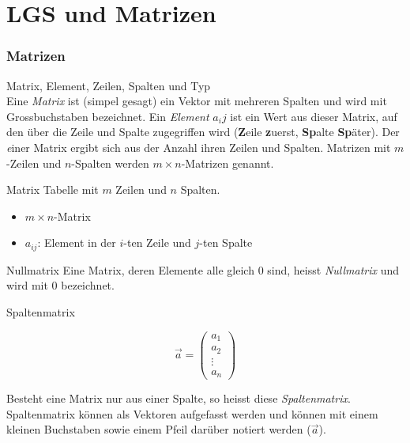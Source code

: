 \graphicspath{{images/}}
\section*{LGS und Matrizen}

\subsubsection*{Matrizen}

    \begin{definition}{{Matrix, Element, Zeilen, Spalten und Typ}}\\
        Eine \textit{Matrix} ist (simpel gesagt) ein Vektor mit mehreren Spalten 
        und wird mit Grossbuchstaben bezeichnet.
        Ein \textit{Element} $a_ij$ ist ein Wert aus dieser Matrix,
        auf den über die Zeile und Spalte zugegriffen wird (\textbf{Z}eile \textbf{z}uerst,
        \textbf{Sp}alte \textbf{Sp}äter).
        Der \textit einer Matrix ergibt sich aus der Anzahl ihren Zeilen und Spalten.
        Matrizen mit $m$-Zeilen und $n$-Spalten werden $m\times n$-Matrizen genannt.
    \end{definition}

    \begin{definition}{Matrix}
        Tabelle mit $m$ Zeilen und $n$ Spalten.
        \begin{itemize}
            \item $m \times n$-Matrix
            \item $a_{ij}$: Element in der $i$-ten Zeile und $j$-ten Spalte
        \end{itemize}
    \end{definition}

    \begin{definition}{Nullmatrix}
        Eine Matrix, deren Elemente alle gleich $0$ sind, heisst \textit{Nullmatrix} und wird mit $0$ bezeichnet.
    \end{definition}

    \begin{definition}{Spaltenmatrix}
        \begin{figure}
            \vspace{-20pt}
            \begin{equation*}
                \vec{a}=\begin{pmatrix}
                    a_1\\a_2\\\vdots\\a_n
                \end{pmatrix}
            \end{equation*}
        \end{figure}
        Besteht eine Matrix nur aus einer Spalte, so heisst diese \textit{Spaltenmatrix}.
        Spaltenmatrix können als Vektoren aufgefasst werden und können mit einem kleinen Buchstaben 
        sowie einem Pfeil darüber notiert werden ($\vec{a}$). 
    \end{definition}

